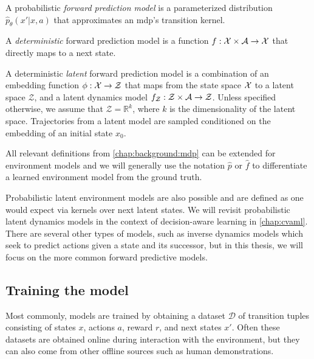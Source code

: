 \begin{definition}
    A probabilistic \emph{forward prediction model} is a parameterized distribution $\hat{p}_\theta(x'|x,a)$ that approximates an \ac{mdp}'s transition kernel.
    
    A \emph{deterministic} forward prediction model is a function $f: \mathcal{X} \times \mathcal{A} \rightarrow \mathcal{X}$ that directly maps to a next state.

    A deterministic \emph{latent} forward prediction model is a combination of an embedding function $\phi: \mathcal{X} \rightarrow \mathcal{Z}$ that maps from the state space $\mathcal{X}$ to a latent space $\mathcal{Z}$, and a latent dynamics model $f_\mathcal{Z}: \mathcal{Z} \times \mathcal{A} \rightarrow \mathcal{Z}$.
    Unless specified otherwise, we assume that $\mathcal{Z} = \mathbb{R}^k$, where $k$ is the dimensionality of the latent space.
    Trajectories from a latent model are sampled conditioned on the embedding of an initial state $x_0$.
\end{definition}

All relevant definitions from \autoref{chap:background:mdp} can be extended for environment models and we will generally use the notation $\hat{p}$ or $\hat{f}$ to differentiate a learned environment model from the ground truth.

Probabilistic latent environment models are also possible and are defined as one would expect via kernels over next latent states.
We will revisit probabilistic latent dynamics models in the context of decision-aware learning in \autoref{chap:cvaml}.
There are several other types of models, such as inverse dynamics models which seek to predict actions given a state and its successor, but in this thesis, we will focus on the more common forward predictive models.

\subsection{Training the model}

Most commonly, models are trained by obtaining a dataset $\mathcal{D}$ of transition tuples consisting of states $x$, actions $a$, reward $r$, and next states $x'$. 
Often these datasets are obtained online during interaction with the environment, but they can also come from other offline sources such as human demonstrations.

